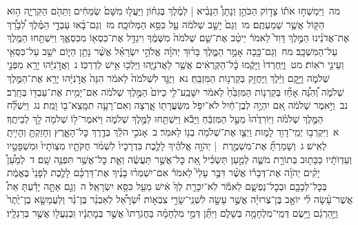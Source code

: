 \documentclass[18pt]{article}
\newcommand{\kri}[1]{\Afootnote{#1}}	%
\begin{document}
 {\loc מה~}וַיִּמְשְׁח֣וּ אֹת֡וֹ צָד֣וֹק הַכֹּהֵ֣ן וְנָתָן֩ הַנָּבִ֨יא  |  לְמֶ֜לֶךְ בְּגִח֗וֹן וַיַּעֲל֤וּ מִשָּׁם֙ שְׂמֵחִ֔ים וַתֵּהֹ֖ם הַקִּרְיָ֑ה ה֥וּא הַקּ֖וֹל אֲשֶׁ֥ר שְׁמַעְתֶּֽם׃ \startlock
 {\loc מו~}וְגַם֙ יָשַׁ֣ב שְׁלֹמֹ֔ה עַ֖ל כִּסֵּ֥א הַמְּלוּכָֽה׃ \startlock
 {\loc מז~}וְגַם־בָּ֜אוּ עַבְדֵ֣י הַמֶּ֗לֶךְ לְ֠בָרֵ֠ךְ אֶת־אֲדֹנֵ֜ינוּ הַמֶּ֣לֶךְ דָּוִד֮ לֵאמֹר֒ יֵיטֵ֨ב  \edtext{(אלהיך)}{\kri{קרי: אֱלֹהִ֜ים}}  אֶת־שֵׁ֤ם שְׁלֹמֹה֙ מִשְּׁמֶ֔ךָ וִיגַדֵּ֥ל אֶת־כִּסְא֖וֹ מִכִּסְאֶ֑ךָ וַיִּשְׁתַּ֥חוּ הַמֶּ֖לֶךְ עַל־הַמִּשְׁכָּֽב׃ \startlock
 {\loc מח~}וְגַם־כָּ֖כָה אָמַ֣ר הַמֶּ֑לֶךְ בָּר֨וּךְ יְהֹוָ֜ה אֱלֹהֵ֣י יִשְׂרָאֵ֗ל אֲשֶׁ֨ר נָתַ֥ן הַיּ֛וֹם יֹשֵׁ֥ב עַל־כִּסְאִ֖י וְעֵינַ֥י רֹאֽוֹת׃ \startlock
 {\loc מט~}וַיֶּֽחֶרְדוּ֙ וַיָּקֻ֔מוּ כׇּ֨ל־הַקְּרֻאִ֔ים אֲשֶׁ֖ר לַאֲדֹנִיָּ֑הוּ וַיֵּלְכ֖וּ אִ֥ישׁ לְדַרְכּֽוֹ׃ \startlock
 {\loc נ~}וַאֲדֹ֣נִיָּ֔הוּ יָרֵ֖א מִפְּנֵ֣י שְׁלֹמֹ֑ה וַיָּ֣קׇם וַיֵּ֔לֶךְ וַֽיַּחֲזֵ֖ק בְּקַרְנ֥וֹת הַמִּזְבֵּֽחַ׃ \startlock
 {\loc נא~}וַיֻּגַּ֤ד לִשְׁלֹמֹה֙ לֵאמֹ֔ר הִנֵּה֙ אֲדֹ֣נִיָּ֔הוּ יָרֵ֖א אֶת־הַמֶּ֣לֶךְ שְׁלֹמֹ֑ה וְ֠הִנֵּ֠ה אָחַ֞ז בְּקַרְנ֤וֹת הַמִּזְבֵּ֙חַ֙ לֵאמֹ֔ר יִשָּׁבַֽע־לִ֤י כַיּוֹם֙ הַמֶּ֣לֶךְ שְׁלֹמֹ֔ה אִם־יָמִ֥ית אֶת־עַבְדּ֖וֹ בֶּחָֽרֶב׃ \startlock
 {\loc נב~}וַיֹּ֣אמֶר שְׁלֹמֹ֔ה אִ֚ם יִהְיֶ֣ה לְבֶן־חַ֔יִל לֹא־יִפֹּ֥ל מִשַּׂעֲרָת֖וֹ אָ֑רְצָה וְאִם־רָעָ֥ה תִמָּֽצֵא־ב֖וֹ וָמֵֽת׃ \startlock
 {\loc נג~}וַיִּשְׁלַ֞ח הַמֶּ֣לֶךְ שְׁלֹמֹ֗ה וַיּֽוֹרִדֻ֙הוּ֙ מֵעַ֣ל הַמִּזְבֵּ֔חַ וַיָּבֹ֕א וַיִּשְׁתַּ֖חוּ לַמֶּ֣לֶךְ שְׁלֹמֹ֑ה וַיֹּאמֶר־ל֥וֹ שְׁלֹמֹ֖ה לֵ֥ךְ לְבֵיתֶֽךָ׃ 
\startlock
 {\loc א~}וַיִּקְרְב֥וּ יְמֵֽי־דָוִ֖ד לָמ֑וּת וַיְצַ֛ו אֶת־שְׁלֹמֹ֥ה בְנ֖וֹ לֵאמֹֽר׃ \startlock
 {\loc ב~}אָנֹכִ֣י הֹלֵ֔ךְ בְּדֶ֖רֶךְ כׇּל־הָאָ֑רֶץ וְחָזַקְתָּ֖ וְהָיִ֥יתָֽ לְאִֽישׁ׃ \startlock
 {\loc ג~}וְשָׁמַרְתָּ֞ אֶת־מִשְׁמֶ֣רֶת  |  יְהֹוָ֣ה אֱלֹהֶ֗יךָ לָלֶ֤כֶת בִּדְרָכָיו֙ לִשְׁמֹ֨ר חֻקֹּתָ֤יו מִצְוֺתָיו֙ וּמִשְׁפָּטָ֣יו וְעֵדְוֺתָ֔יו כַּכָּת֖וּב בְּתוֹרַ֣ת מֹשֶׁ֑ה לְמַ֣עַן תַּשְׂכִּ֗יל אֵ֚ת כׇּל־אֲשֶׁ֣ר תַּעֲשֶׂ֔ה וְאֵ֛ת כׇּל־אֲשֶׁ֥ר תִּפְנֶ֖ה שָֽׁם׃ \startlock
 {\loc ד~}לְמַ֩עַן֩ יָקִ֨ים יְהֹוָ֜ה אֶת־דְּבָר֗וֹ אֲשֶׁ֨ר דִּבֶּ֣ר עָלַי֮ לֵאמֹר֒ אִם־יִשְׁמְר֨וּ בָנֶ֜יךָ אֶת־דַּרְכָּ֗ם לָלֶ֤כֶת לְפָנַי֙ בֶּאֱמֶ֔ת בְּכׇל־לְבָבָ֖ם וּבְכׇל־נַפְשָׁ֑ם לֵאמֹ֕ר לֹֽא־יִכָּרֵ֤ת לְךָ֙ אִ֔ישׁ מֵעַ֖ל כִּסֵּ֥א יִשְׂרָאֵֽל׃ \startlock
 {\loc ה~}וְגַ֣ם אַתָּ֣ה יָדַ֡עְתָּ אֵת֩ אֲשֶׁר־עָ֨שָׂה לִ֜י יוֹאָ֣ב בֶּן־צְרוּיָ֗ה אֲשֶׁ֣ר עָשָׂ֣ה לִשְׁנֵֽי־שָׂרֵ֣י צִבְא֣וֹת יִ֠שְׂרָאֵ֠ל לְאַבְנֵ֨ר בֶּן־נֵ֜ר וְלַעֲמָשָׂ֤א בֶן־יֶ֙תֶר֙ וַיַּ֣הַרְגֵ֔ם וַיָּ֥שֶׂם דְּמֵֽי־מִלְחָמָ֖ה בְּשָׁלֹ֑ם וַיִּתֵּ֞ן דְּמֵ֣י מִלְחָמָ֗ה בַּחֲגֹֽרָתוֹ֙ אֲשֶׁ֣ר בְּמׇתְנָ֔יו וּֽבְנַעֲל֖וֹ אֲשֶׁ֥ר בְּרַגְלָֽיו׃ \startlock
\end{document}
